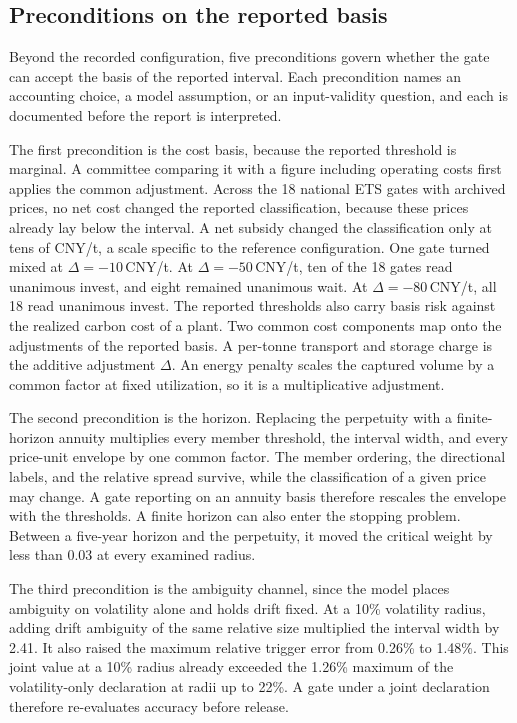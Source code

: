 \subsection{Preconditions on the reported basis}

Beyond the recorded configuration, five preconditions govern whether the gate can accept the basis of the reported interval. Each precondition names an accounting choice, a model assumption, or an input-validity question, and each is documented before the report is interpreted.

The first precondition is the cost basis, because the reported threshold is marginal. A committee comparing it with a figure including operating costs first applies the common adjustment. Across the 18 national ETS gates with archived prices, no net cost changed the reported classification, because these prices already lay below the interval. A net subsidy changed the classification only at tens of CNY/t, a scale specific to the reference configuration. One gate turned mixed at $\Delta=-10$\,CNY/t. At $\Delta=-50$\,CNY/t, ten of the 18 gates read unanimous invest, and eight remained unanimous wait. At $\Delta=-80$\,CNY/t, all 18 read unanimous invest. The reported thresholds also carry basis risk against the realized carbon cost of a plant. Two common cost components map onto the adjustments of the reported basis. A per-tonne transport and storage charge is the additive adjustment $\Delta$. An energy penalty scales the captured volume by a common factor at fixed utilization, so it is a multiplicative adjustment.

The second precondition is the horizon. Replacing the perpetuity with a finite-horizon annuity multiplies every member threshold, the interval width, and every price-unit envelope by one common factor. The member ordering, the directional labels, and the relative spread survive, while the classification of a given price may change. A gate reporting on an annuity basis therefore rescales the envelope with the thresholds. A finite horizon can also enter the stopping problem. Between a five-year horizon and the perpetuity, it moved the critical weight by less than 0.03 at every examined radius.

The third precondition is the ambiguity channel, since the model places ambiguity on volatility alone and holds drift fixed. At a 10\% volatility radius, adding drift ambiguity of the same relative size multiplied the interval width by 2.41. It also raised the maximum relative trigger error from 0.26\% to 1.48\%. This joint value at a 10\% radius already exceeded the 1.26\% maximum of the volatility-only declaration at radii up to 22\%. A gate under a joint declaration therefore re-evaluates accuracy before release.

